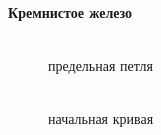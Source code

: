 \documentclass[a4paper, 12pt]{article}
\begin{document}
\begin{center}
	\textbf{Кремнистое железо}
\end{center}

\begin{figure}[h]
	\begin{minipage}[h]{0.5\linewidth}
		\\ предельная петля
	\end{minipage}
	\begin{minipage}[h]{0.5\linewidth}
		\\ начальная кривая
	\end{minipage}
\end{figure}
\end{document}
